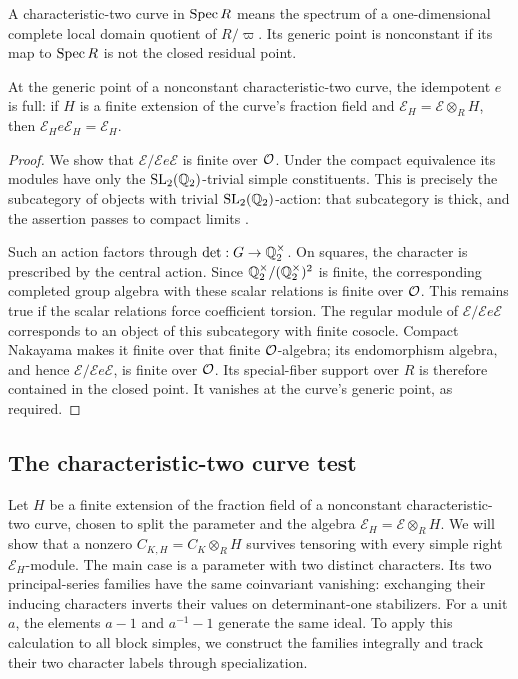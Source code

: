 A characteristic-two curve in \(\operatorname{Spec} R\) means the spectrum of a
one-dimensional complete local domain quotient of \(R/\varpi\). Its
generic point is nonconstant if its map to \(\operatorname{Spec} R\) is not the
closed residual point.

\begin{lemma}\label{lem:full-corner}
At the generic point of a nonconstant characteristic-two curve, the
idempotent \(e\) is full: if \(H\) is a finite extension of the curve's
fraction field and \(\mathcal E_H=\mathcal E\otimes_RH\), then
\(\mathcal E_He\mathcal E_H=\mathcal E_H\).
\end{lemma}
\begin{proof}
We show that \(\mathcal E/\mathcal E e\mathcal E\) is finite over
\(\mathcal O\). Under the compact equivalence its modules have only the
\(\operatorname{SL}_2(\mathbb Q_2)\)-trivial simple constituents. This is precisely the
subcategory of objects with trivial \(\operatorname{SL}_2(\mathbb Q_2)\)-action: that
subcategory is thick, and the assertion passes to compact limits
\cite[Section~4.2]{PaskunasTung2021}.

Such an action factors through \(\det:G\to\mathbb Q_2^\times\). On squares,
the character is prescribed by the central action. Since
\(\mathbb Q_2^\times/(\mathbb Q_2^\times)^2\) is finite, the corresponding completed
group algebra with these scalar relations is finite over \(\mathcal O\).
This remains true if the scalar relations force coefficient torsion.
The regular module of \(\mathcal E/\mathcal E e\mathcal E\) corresponds
to an object of this subcategory with finite cosocle. Compact Nakayama
makes it finite over that finite \(\mathcal O\)-algebra; its endomorphism
algebra, and hence \(\mathcal E/\mathcal E e\mathcal E\), is finite over
\(\mathcal O\). Its special-fiber support over \(R\) is therefore contained in the
closed point. It vanishes at the curve's generic point, as required.
\end{proof}

\subsection{The characteristic-two curve test}

Let $H$ be a finite extension of the fraction field of a nonconstant
characteristic-two curve, chosen to split the parameter and the algebra
$\mathcal E_H=\mathcal E\otimes_R H$. We will show that a nonzero
$C_{K,H}=C_K\otimes_R H$ survives tensoring with every simple right
$\mathcal E_H$-module. The main case is a parameter
with two distinct characters. Its two principal-series families have
the same coinvariant vanishing: exchanging their inducing characters
inverts their values on determinant-one stabilizers. For a unit $a$,
the elements $a-1$ and $a^{-1}-1$ generate the same ideal.
To apply this calculation to all block simples, we construct the
families integrally and track their two character labels through
specialization.

